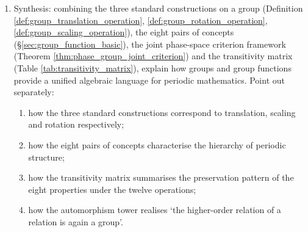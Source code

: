 \begin{enumerate}[leftmargin=3em, label=\textbf{Exercise \arabic*}]
    \item Synthesis: combining the three standard constructions on a group (Definition \ref{def:group_translation_operation},
    \ref{def:group_rotation_operation}, \ref{def:group_scaling_operation}),
    the eight pairs of concepts (\S\ref{sec:group_function_basic}),
    the joint phase-space criterion framework (Theorem \ref{thm:phase_group_joint_criterion})
    and the transitivity matrix (Table \ref{tab:transitivity_matrix}),
    explain how groups and group functions provide a unified algebraic language for periodic mathematics.
    Point out separately:
    \begin{enumerate}[label=(\roman*)]
        \item how the three standard constructions correspond to translation, scaling and rotation respectively;
        \item how the eight pairs of concepts characterise the hierarchy of periodic structure;
        \item how the transitivity matrix summarises the preservation pattern of the eight properties under the twelve operations;
        \item how the automorphism tower realises `the higher-order relation of a relation is again a group'.
    \end{enumerate}
\end{enumerate}
